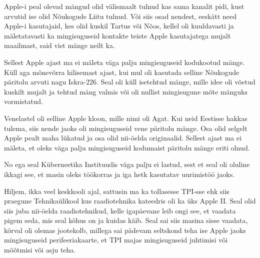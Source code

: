 
Apple-i peal olevad mängud olid välismaalt tulnud kas sama kanalit pidi, kust 
arvutid ise olid Nõukogude Liitu tulnud. Või siis osad nendest, eeskätt need 
Apple-i kasutajaid, kes olid kuskil Tartus või Nõos, kellel oli kuuldavasti ja 
mäletatavasti ka mingisuguseid kontakte teiste Apple kasutajatega mujalt 
maailmast, said vist mänge neilt ka.


Sellest Apple ajast ma ei mäleta väga palju mingisuguseid kodukootud mänge. 
Küll aga mõnevõrra hilisemast ajast, kui mul oli kasutada selline Nõukogude 
päritolu arvuti nagu 
Iskra-226. Seal oli küll 
isetehtud mänge, mille idee oli võetud kuskilt mujalt ja tehtud mäng valmis  
või oli nullist mingisugune mõte mänguks vormistatud. 

Venelastel oli selline Apple kloon, mille  nimi oli  Agat. 
Kui neid Eestisse hakkas tulema, siis nende jaoks oli mingisuguseid vene 
päritolu mänge. Osa  olid selgelt Apple pealt maha lükatud ja osa olid  
nii-öelda originaalid. Sellest ajast ma ei mäleta, et oleks väga palju 
mingisuguseid kodumaist päritolu mänge eriti olnud.


No ega seal Küberneetika Instituudis väga palju 
ei lastud, sest et seal oli oluline ikkagi see, et masin oleks töökorras ja iga 
hetk kasutatav  uurimistöö jaoks.

Hiljem, ikka veel keskkooli ajal, sattusin ma ka tollasesse TPI-sse ehk siis 
praegune Tehnikaülikool kus raadiotehnika 
kateedris oli ka üks Apple II.  Seal olid siis juba 
nii-öelda raadiotehnikud, kelle igapäevane leib ongi see,  et vaadata pigem 
seda, mis seal kõhus on ja kuidas käib. Seal sai siis masina sisse vaadata, 
kõrval oli olemas  jootekolb, millega sai pädevam seltskond teha ise Apple 
jaoks mingisuguseid perifeeriakaarte, et TPI majas mingisuguseid juhtimisi või 
mõõtmisi või asju teha.  

